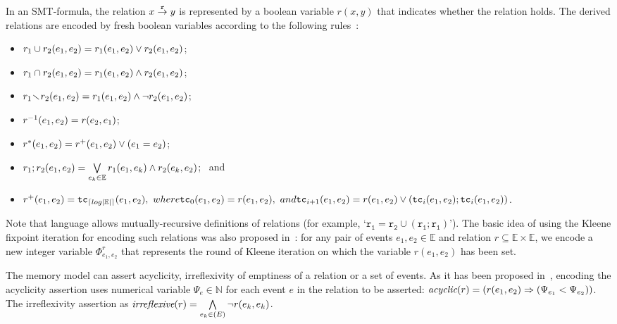 In an SMT-formula, the relation $x \overset{\texttt{r}}{\rightarrow} y$ is represented by a boolean variable $r(x, y)$ that indicates whether the relation holds.
The derived relations are encoded by fresh boolean variables according to the following rules~\cite{Porthos17b}:
\begin{itemize}[noitemsep,topsep=0pt]
\item $r_1 \cup r_2(e_1, e_2) = r_1(e_1, e_2) \lor r_2(e_1, e_2)$;
\item $r_1 \cap r_2(e_1, e_2) = r_1(e_1, e_2) \land r_2(e_1, e_2)$;
\item $r_1 \!\smallsetminus\! r_2(e_1, e_2) = r_1(e_1, e_2) \land \neg r_2(e_1, e_2)$;
\item $r^{-1}(e_1, e_2) = r(e_2, e_1)$;
\item $r^{*}(e_1, e_2) = r^{+}(e_1, e_2) \lor (e_1 = e_2)$;
\item $r_1;r_2(e_1,e_2) = \bigvee\limits_{e_k \in \mathbb{E}}^{} r_1(e_1,e_k) \land r_2(e_k,e_2)$; \ and
\item $r^{+}(e_1, e_2) \defeq \texttt{tc}_{\left\lceil log|\mathbb{E}| \right\rceil} (e_1, e_2), \ where \vspace{0.25em} \\
\texttt{tc}_{0}(e_1,e_2) \defeq r(e_1,e_2), \ and \\
\texttt{tc}_{i+1}(e_1,e_2) \defeq r(e_1,e_2) \lor (\texttt{tc}_{i}(e_1,e_2);\texttt{tc}_{i}(e_1,e_2))$.
\end{itemize}
\vspace{1em}

Note that \cat{} language allows mutually-recursive definitions of relations (for example, `$\texttt{r}_\texttt{1} = \texttt{r}_\texttt{2} \cup (\texttt{r}_\texttt{1}; \texttt{r}_\texttt{1})$').
The basic idea of using the Kleene fixpoint iteration for encoding such relations was also proposed in~\cite{Porthos17a}: for any pair of events $e_1,e_2 \in \mathbb{E}$ and relation $r \subseteq \mathbb{E} \times \mathbb{E}$, we encode a new integer variable $\Phi_{e_1,e_2}^{r}$ that represents the round of Kleene iteration on which the variable $r(e_1, e_2)$ has been set.

The memory model can assert acyclicity, irreflexivity of emptiness of a relation or a set of events.
As it has been proposed in~\cite{Porthos17a}, encoding the acyclicity assertion uses numerical variable $\Psi_e \in \mathbb{N}$ for each event $e$ in the relation to be asserted: $\textit{acyclic}(r) = (r(e_1,e_2) \Rightarrow (\Psi_{e_1} < \Psi_{e_2}))$.
The irreflexivity assertion as $\textit{irreflexive}(r) = \bigwedge\limits_{e_k \in \mathbb(E)}^{} \lnot r(e_k,e_k)$.

